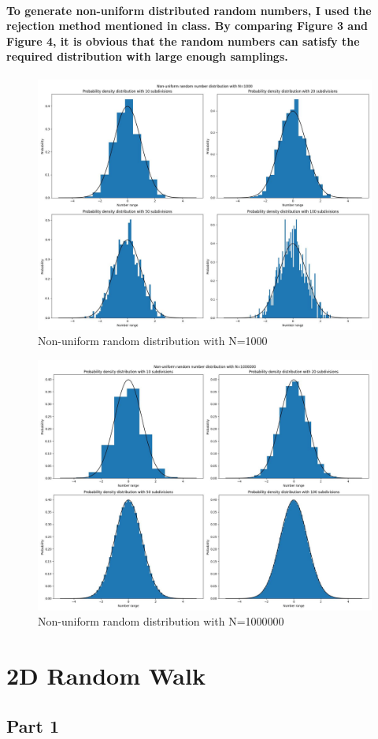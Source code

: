 \documentclass{article}
\begin{document}
\paragraph{
To generate non-uniform distributed random numbers, I used the rejection method mentioned in class. By comparing Figure 3 and Figure 4, it is obvious that the random numbers can satisfy the required distribution with large enough samplings.
}
\begin{figure}[htbp]
    \centering
    \includegraphics[width=0.5\linewidth]{Part1_2_N=1000.jpeg}
    \caption{Non-uniform random distribution with N=1000}
\end{figure}
\begin{figure}[htbp]
    \centering
    \includegraphics[width=0.5\linewidth]{Part1_2_N=1000000.jpeg}
    \caption{Non-uniform random distribution with N=1000000}
\end{figure}
\section{2D Random Walk}
\subsection{Part 1}
\end{document}
